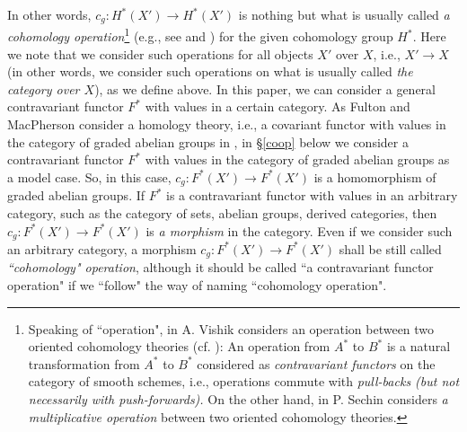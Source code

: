 \documentclass[a4paper]{amsart}
\begin{document}
In other words, $c_g: H^*(X') \to H^*(X')$ is nothing but what is usually called \emph{a cohomology operation}\footnote{Speaking of ``operation", in \cite{Vishik2} A. Vishik considers an operation between two oriented cohomology theories \cite{LM} (cf. \cite{LP}): An operation from $A^*$ to $B^*$ is a natural transformation from $A^*$ to $B^*$ considered as \emph{contravariant functors} on the category of smooth schemes, i.e., operations commute with \emph{pull-backs (but not necessarily with push-forwards).} On the other hand, in \cite{Sechin} P. Sechin considers \emph{a multiplicative operation} between two oriented cohomology theories.} (e.g., see \cite{Steenrod1, Steenrod2, Steenrod3} and \cite{nLab2}) for the given cohomology group $H^*$. Here we note that we consider such operations for all objects $X'$ over $X$, i.e., $X' \to X$ (in other words, we consider such operations on what is usually called \emph{the category over $X$}), as we define above. In this paper, we can consider a general contravariant functor $F^*$ with values in a certain category. As Fulton and MacPherson consider a homology theory, i.e., a covariant functor with values in the category of graded abelian groups in \cite[\S 8.1]{FM}, in \S \ref{coop} below we consider a contravariant functor $F^*$ with values in the category of graded abelian groups as a model case. So, in this case, $c_g: F^*(X') \to F^*(X')$ is a homomorphism of graded abelian groups. If $F^*$ is a contravariant functor with values in an arbitrary category, such as the category of sets, abelian groups, derived categories, then  $c_g: F^*(X') \to F^*(X')$ is \emph{a morphism} in the category. Even if we consider such an arbitrary category, a morphism $c_g: F^*(X') \to F^*(X')$  shall be still called \emph{``cohomology" operation}, although it should be called ``a contravariant functor operation" if we ``follow" the way of naming ``cohomology operation". 
\end{document}
